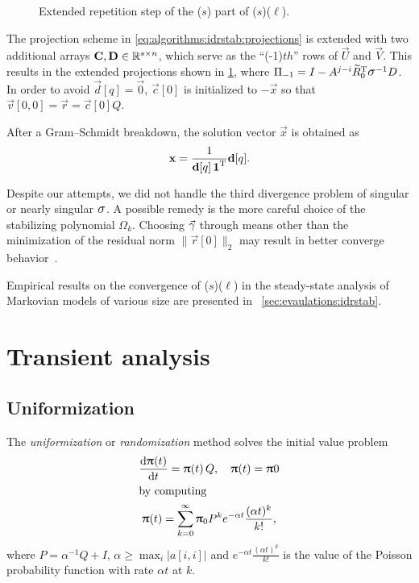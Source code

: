 \begin{figure}
  \centering\usebox\IdrStabProjectionsBox
  \caption{Extended repetition step of the ($s$) part of ($s$)($\ell$).}
  \label{fig:algorithms:idrstab:extended-projections}
\end{figure}

The projection scheme in \vref{eq:algorithms:idrstab:projections} is
extended with two additional arrays
$\bm{\mathrm{C}}, \bm{\mathrm{D}} \in \mathbb{R}^{s \times n}$, which serve as the
``(-1)$th$'' rows of $\vec{U}$ and $\vec{V}$. This results in the
extended projections shown in
\cref{fig:algorithms:idrstab:extended-projections}, where
$\Pi_{-1} = I - A^{j - i} \widetilde{R}_0^\T \largesigma^{-1} D$.  In
order to avoid $\vec{d}[q] = \vec{0}$, $\vec{c}[0]$ is initialized to
$-\vec{x}$ so that $\vec{v}[0, 0] = \vec{r} = \vec{c}[0] Q$.

After a Gram--Schmidt breakdown, the solution vector $\vec{x}$ is
obtained as
\begin{equation}
  \bm{\mathrm{x}} = \frac{1}{\bm{\mathrm{d}}[q] \, \bm{\mathrm{1}}^{\mathrm{T}}} \bm{\mathrm{d}}[q] \text.
\end{equation}

Despite our attempts, we did not handle the third divergence problem
of singular or nearly singular $\largesigma$. A possible remedy is the
more careful choice of the stabilizing polynomial $\Omega_k$. Choosing
$\vecarrow{\gamma}$ through means other than the minimization of the
residual norm $\| \vec{r}[0] \|_2$ may result in better converge
behavior~\citep{rendel2011tuning,sleijpen1995maintaining}.

Empirical results on the convergence of
($s$)($\ell$) in the steady-state analysis of
Markovian models of various size are presented in%
~\vref{sec:evaulations:idrstab}.

\section{Transient analysis}

\subsection{Uniformization}
\label{ssec:algorithms:uniformization}

The \emph{uniformization} or \emph{randomization} method solves the
initial value problem
\begin{gather}
  \frac{\mathrm{d} \bm{\mathrm{\uppi}}(t)}{\mathrm{d} t} = \bm{\mathrm{\uppi}}(t) \, Q, \quad
  \bm{\mathrm{\uppi}}(t) = \bm{\mathrm{\uppi}}{0} \label{eq:algorithms:transient:diffeq}\\
  \shortintertext{by computing}
  \bm{\mathrm{\uppi}}(t) = \sum_{k = 0}^{\infty} \bm{\mathrm{\uppi}}_0 P^k e^{-\alpha
    t} \frac{(\alpha t)^k}{k!}\text,
  \label{eq:algorithms:transient:uniformization}
\end{gather}
where $P = \alpha^{-1} Q + I$,
$\alpha \ge \max_{i} \lvert a[i, i] \rvert$ and
$e^{-\alpha t} \frac{(\alpha t)^k}{k!}$ is the value of the Poisson
probability function with rate $\alpha t$ at $k$.

